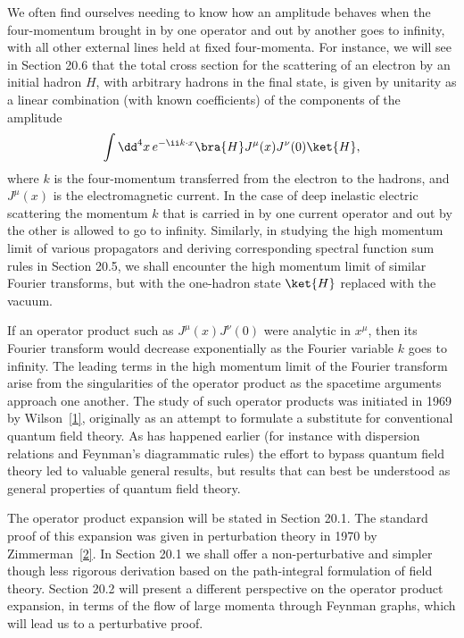
We often find ourselves needing to know how an amplitude behaves when the
four-momentum brought in by one operator and out by another goes to infinity,
with all other external lines held at fixed four-momenta. For instance, we
will see in Section 20.6 that the total cross section for the scattering of an
electron by an initial hadron $H$, with arbitrary hadrons in the final state,
is given by unitarity as a linear combination (with known coefficients) of
the components of the amplitude
\[
 \int \dd^4x\,e^{-\ii k\cdot x}
 \bra{H}J^\mu(x)J^\nu(0)\ket{H},
\]
where $k$ is the four-momentum transferred from the electron to the hadrons,
and $J^\mu(x)$ is the electromagnetic current. In the case of deep inelastic
electric scattering the momentum $k$ that is carried in by one current
operator and out by the other is allowed to go to infinity. Similarly, in
studying the high momentum limit of various propagators and deriving
corresponding spectral function sum rules in Section 20.5, we shall encounter
the high momentum limit of similar Fourier transforms, but with the
one-hadron state $\ket{H}$ replaced with the vacuum.

If an operator product such as $J^\mu(x)J^\nu(0)$ were analytic in $x^\mu$,
then its Fourier transform would decrease exponentially as the Fourier
variable $k$ goes to infinity. The leading terms in the high momentum limit
of the Fourier transform arise from the singularities of the operator product
as the spacetime arguments approach one another. The study of such operator
products was initiated in 1969 by Wilson~\hyperref[ch20-ref-1]{[1]},
originally as an attempt to formulate a substitute for conventional quantum
field theory. As has happened earlier (for instance with dispersion
relations and Feynman's diagrammatic rules) the effort to bypass quantum
field theory led to valuable general results, but results that can best be
understood as general properties of quantum field theory.

The operator product expansion will be stated in Section 20.1. The standard
proof of this expansion was given in perturbation theory in 1970 by
Zimmerman~\hyperref[ch20-ref-2]{[2]}. In Section 20.1 we shall offer a
non-perturbative and simpler though less rigorous derivation based on the
path-integral formulation of field theory. Section 20.2 will present a
different perspective on the operator product expansion, in terms of the flow
of large momenta through Feynman graphs, which will lead us to a perturbative
proof.

